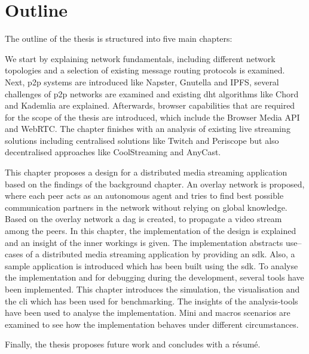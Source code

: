 \section{Outline}
The outline of the thesis is structured into five main chapters:
\begin{itemize}
     We start by explaining network fundamentals, including different network topologies and a selection of existing message routing protocols is examined. Next, \gls{p2p} systems are introduced like Napster, Gnutella and IPFS, several challenges of \gls{p2p} networks are examined and existing \gls{dht} algorithms like Chord and Kademlia are explained. Afterwards, browser capabilities that are required for the scope of the thesis are introduced, which include the Browser Media API and WebRTC. The chapter finishes with an analysis of existing live streaming solutions including centralised solutions like Twitch and Periscope but also decentralised approaches like CoolStreaming and AnyCast.
    
     This chapter proposes a design for a distributed media streaming application based on the findings of the background chapter. An overlay network is proposed, where each peer acts as an autonomous agent and tries to find best possible communication partners in the network without relying on global knowledge. Based on the overlay network a \gls{dag} is created, to propagate a video stream among the peers.
     In this chapter, the implementation of the design is explained and an insight of the inner workings is given. The implementation abstracts use–cases of a distributed media streaming application by providing an \gls{sdk}. Also, a sample application is introduced which has been built using the \gls{sdk}.
     To analyse the implementation and for debugging during the development, several tools have been implemented. This chapter introduces the simulation, the visualisation and the \gls{cli} which has been used for benchmarking.
     The insights of the analysis-tools have been used to analyse the implementation. Mini and macros scenarios are examined to see how the implementation behaves under different circumstances. 
\end{itemize}
Finally, the thesis proposes future work and concludes with a résumé.
